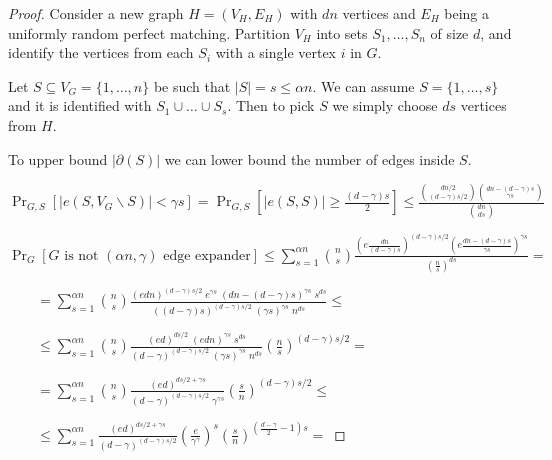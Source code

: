 \begin{proof}
    Consider a new graph $H=(V_H,E_H)$ with $dn$ vertices
    and $E_H$ being a uniformly random perfect matching.
    Partition $V_H$ into sets $S_1,\ldots,S_n$ of size $d$,
    and identify the vertices from each $S_i$ with a single vertex $i$ in $G$.
    
    Let $S\subseteq V_G=\{1,\ldots,n\}$ be such that $|S|=s\leq\alpha n$.
    We can assume $S=\{1,\ldots,s\}$ and it is identified with $S_1\cup\ldots\cup S_{s}$.
    Then to pick $S$ we simply choose $ds$ vertices from $H$.
    
    To upper bound $|\partial(S)|$ we can lower bound the number of edges inside $S$.

    $\Pr_{G,S}[|e(S,V_G\backslash S)| < \gamma s] = \Pr_{G,S}\left[|e(S,S)|\geq\frac{(d-\gamma)s}{2}\right]
    \leq\frac{\binom{dn/2}{(d-\gamma)s/2}\binom{dn-(d-\gamma)s}{\gamma s}}{\binom{dn}{ds}}$
    
    $\Pr_G[G\text{ is not }(\alpha n,\gamma)\text{ edge expander}]
    \leq\sum_{s=1}^{\alpha n}{
        \binom{n}{s}
        \frac{
            \left(e\frac{dn}{(d-\gamma)s}\right)^{(d-\gamma)s/2}
            \left(e\frac{dn-(d-\gamma)s}{\gamma s}\right)^{\gamma s}
        }
        {\left(\frac{n}{s}\right)^{ds}}
    }=$

    $\qquad=\sum_{s=1}^{\alpha n}{
        \binom{n}{s}
        \frac{
            (edn)^{(d-\gamma)s/2}\;
            e^{\gamma s}\;
            (dn-(d-\gamma)s)^{\gamma s}\;
            s^{ds}
        }
        {
            ((d-\gamma)s)^{(d-\gamma)s/2}\;
            (\gamma s)^{\gamma s}\;
            n^{ds}
        }
    }\leq$

    $\qquad\leq\sum_{s=1}^{\alpha n}{
        \binom{n}{s}
        \frac{
            (ed)^{ds/2}\;
            (edn)^{\gamma s}\;
            s^{ds}
        }
        {
            (d-\gamma)^{(d-\gamma)s/2}\;
            (\gamma s)^{\gamma s}\;
            n^{ds}
        }
        \left(\frac{n}{s}\right)^{(d-\gamma)s/2}
    }=$

    $\qquad=\sum_{s=1}^{\alpha n}{
        \binom{n}{s}
        \frac{(ed)^{ds/2+\gamma s}}
        {
            (d-\gamma)^{(d-\gamma)s/2}\;
            \gamma^{\gamma s}
        }
        \left(\frac{s}{n}\right)^{(d-\gamma)s/2}
    }\leq$

    $\qquad\leq\sum_{s=1}^{\alpha n}{
        \frac{(ed)^{ds/2+\gamma s}}{(d-\gamma)^{(d-\gamma)s/2}}
        \left(\frac{e}{\gamma^\gamma}\right)^s
        \left(\frac{s}{n}\right)^{\left(\frac{d-\gamma}{2}-1\right)s}
    }=$


\end{proof}
